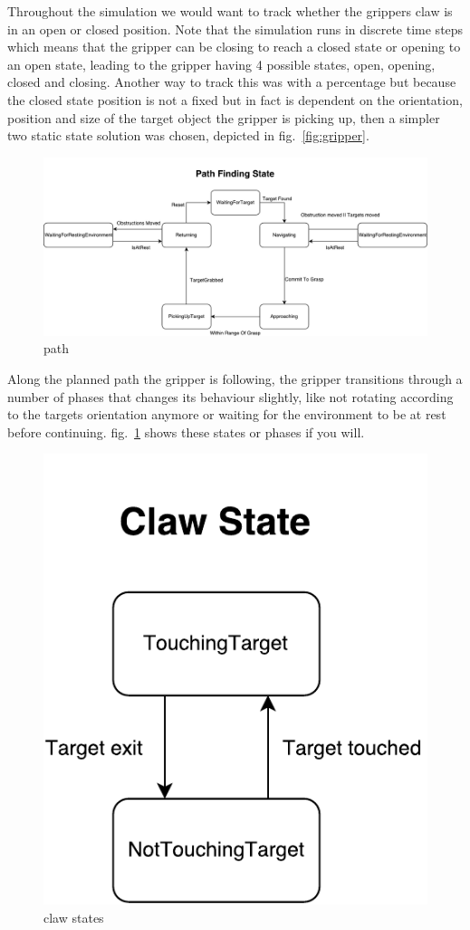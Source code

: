 Throughout the simulation we would want to track whether the grippers claw is in an open or closed position. Note that the simulation runs in discrete time steps which means that the gripper can be closing to reach a closed state or opening to an open state, leading to the gripper having 4 possible states, open, opening, closed and closing. Another way to track this was with a percentage but because the closed state position is not a fixed but in fact is dependent on the orientation, position and size of the target object the gripper is picking up, then a simpler two static state solution was chosen, depicted in fig.~\ref{fig:gripper}.

\begin{figure}
\centering
\includegraphics[width=\linewidth]{figures/statediagrams/path.pdf}
\caption{path}
\label{fig:path}
\end{figure}

Along the planned path the gripper is following, the gripper transitions through a number of phases that changes its behaviour slightly, like not rotating according to the targets orientation anymore or waiting for the environment to be at rest before continuing. fig.~\ref{fig:path} shows these states or phases if you will.

\begin{figure}
\centering
\includegraphics[width=.3\linewidth]{figures/statediagrams/claw-states.pdf}
\caption{claw states}
\label{fig:claw}
\end{figure}

